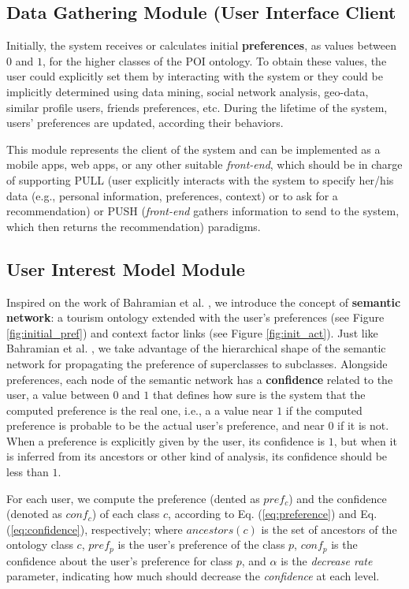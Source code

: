 \subsection{Data Gathering Module (User Interface Client}
Initially, the system receives or calculates
initial \textbf{preferences}, as 
values between $0$ and $1$, for the higher classes of the POI ontology. To obtain these values, the user could explicitly set them by interacting with the system or they could be implicitly determined using data mining, social network analysis, geo-data, similar profile users, friends preferences, etc. During the lifetime of the system, users' preferences are updated, according their behaviors. 

This module represents the client of the system and can be implemented as a mobile apps, web apps, or any other suitable \textit{front-end}, which should be in charge of supporting PULL (user explicitly interacts with the system to specify her/his data (e.g., personal information, preferences, context) or to ask for a recommendation) or PUSH (\textit{front-end} gathers information to send to the system, which then returns the recommendation) paradigms.


\subsection{User Interest Model Module}
Inspired on the work of Bahramian et al. \cite{bahramian_abbaspour_claramunt_2017}, we introduce the concept of \textbf{semantic network}: a tourism ontology extended with the user's preferences (see Figure \ref{fig:initial_pref}) and context factor links
(see Figure \ref{fig:init_act}). Just like Bahramian et al. \cite{bahramian_abbaspour_claramunt_2017}, we take advantage of the hierarchical shape of the semantic network for propagating the preference of superclasses to subclasses. Alongside preferences, each node of the semantic network has a \textbf{confidence} related to the user, a value between $0$ and $1$ that defines how sure is the system that the computed preference is the real one, i.e., a 
a value near $1$ if the computed preference is probable to be the actual user's preference, and near $0$ if it is not. When a preference is explicitly given by the user, its confidence is $1$, but when it is inferred from its ancestors or other kind of analysis, its confidence should be less than $1$. 

For each user, we compute the preference (dented as $pref_c$) and the confidence (denoted as $conf_c$) of each class $c$, according to Eq. (\ref{eq:preference}) and Eq. (\ref{eq:confidence}), respectively; 
where $ancestors(c)$ is the set of ancestors of the ontology class $c$, $pref_p$ is the user's preference of the class $p$, $conf_p$ is the confidence about the user's preference for
class $p$, and $\alpha$ is  the \textit{decrease rate} parameter, indicating
how much should decrease the \textit{confidence} at each level. 

